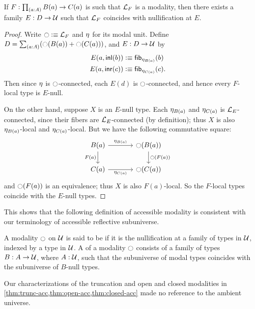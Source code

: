 \begin{lem}\label{thm:acc-modal}
  If $F:\prd{a:A} B(a)\to C(a)$ is such that $\localization{F}$ is a modality, then there exists a family $E:D\to \UU$ such that $\localization{F}$ coincides with nullification at $E$.
\end{lem}
\begin{proof}
  Write $\modal\defeq\localization{F}$ and $\modalunit$ for its modal unit.
  Define $D = \sm{a:A} (\modal (B(a)) + \modal(C(a)))$, and $E:D\to \UU$ by
  \begin{align*}
    E(a,\inl(b)) &\defeq \fib{\modalunit[B(a)]}{b}\\
    E(a,\inr(c)) &\defeq \fib{\modalunit[C(a)]}{c}.
  \end{align*}
  Then since $\modalunit$ is $\modal$-connected, each $E(d)$ is $\modal$-connected, and hence every $F$-local type is $E$-null.

  On the other hand, suppose $X$ is an $E$-null type.
  Each $\modalunit[B(a)]$ and $\modalunit[C(a)]$ is $\localization{E}$-connected, since their fibers are $\localization{E}$-connected (by definition); thus $X$ is also $\modalunit[B(a)]$-local and $\modalunit[C(a)]$-local.
  But we have the following commutative square:
  \[
  \begin{tikzcd}[column sep=large]
    B(a) \ar[r,"{\modalunit[B(a)]}"] \ar[d,"F(a)"'] & \modal(B(a)) \ar[d,"{\modal(F(a))}"]\\
    C(a) \ar[r,"{\modalunit[C(a)]}"'] & \modal(C(a))
  \end{tikzcd}
  \]
  and ${\modal(F(a))}$ is an equivalence; thus $X$ is also $F(a)$-local.
  So the $F$-local types coincide with the $E$-null types.
\end{proof}

This shows that the following definition of accessible modality is consistent with our terminology of accessible reflective subuniverse.

\begin{defn}\label{defn:accessible}
A modality $\modal$ on $\UU$ is said to be  if it is the nullification at a family of types in $\UU$, indexed by a type in $\UU$.
A  of a modality $\modal$ consists of a family of types $B: A\to\UU$, where $A:\UU$, such that the subuniverse of modal types coincides with the subuniverse of $B$-null types.
\end{defn}

\begin{egs}
  Our characterizations of the truncation and open and closed modalities in \cref{thm:trunc-acc,thm:open-acc,thm:closed-acc} made no reference to the ambient universe.
\end{egs}

